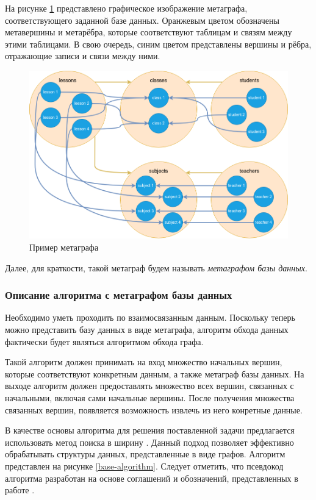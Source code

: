 На рисунке \ref{metagraph-example} представлено графическое изображение метаграфа, соответствующего заданной базе данных. Оранжевым цветом обозначены метавершины и метарёбра, которые соответствуют таблицам и связям между этими таблицами. В свою очередь, синим цветом представлены вершины и рёбра, отражающие записи и связи между ними.

\begin{figure}
  \includegraphics[scale=0.5]{./img/drawio-metagraph-overview.png}
  \caption{Пример метаграфа}
  \label{metagraph-example}
\end{figure}

Далее, для краткости, такой метаграф будем называть \textit{метаграфом базы данных}.

\subsubsection{Описание алгоритма с метаграфом базы данных}
Необходимо уметь проходить по взаимосвязанным данным. Поскольку теперь можно представить базу данных в виде метаграфа, алгоритм обхода данных фактически будет являться алгоритмом обхода графа.

Такой алгоритм должен принимать на вход множество начальных вершин, которые соответствуют конкретным данным, а также метаграф базы данных. На выходе алгоритм должен предоставлять множество всех вершин, связанных с начальными, включая сами начальные вершины. После получения множества связанных вершин, появляется возможность извлечь из него конретные данные.

В качестве основы алгоритма для решения поставленной задачи предлагается использовать метод поиска в ширину \cite{bfs}. Данный подход позволяет эффективно обрабатывать структуры данных, представленные в виде графов. Алгоритм представлен на рисунке \ref{base-algorithm}. Следует отметить, что псевдокод алгоритма разработан на основе соглашений и обозначений, представленных в работе \cite{kormen-algorithms}.

